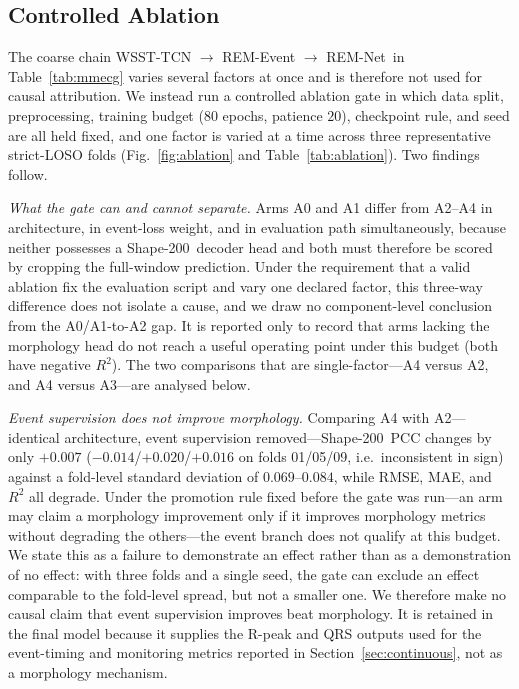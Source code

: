 \documentclass[lettersize,journal]{IEEEtran}
\newcommand{\remnet}{REM-Net\xspace}
\newcommand{\shape}{Shape-200\xspace}
\begin{document}
\subsection{Controlled Ablation}
\label{sec:ablation}
The coarse chain WSST-TCN $\rightarrow$ REM-Event $\rightarrow$ \remnet\ in Table~\ref{tab:mmecg} varies several factors at once and is therefore not used for causal attribution. We instead run a controlled ablation gate in which data split, preprocessing, training budget ($80$ epochs, patience $20$), checkpoint rule, and seed are all held fixed, and one factor is varied at a time across three representative strict-LOSO folds (Fig.~\ref{fig:ablation} and Table~\ref{tab:ablation}). Two findings follow.

\emph{What the gate can and cannot separate.} Arms A0 and A1 differ from A2--A4 in architecture, in event-loss weight, and in evaluation path simultaneously, because neither possesses a \shape\ decoder head and both must therefore be scored by cropping the full-window prediction. Under the requirement that a valid ablation fix the evaluation script and vary one declared factor, this three-way difference does not isolate a cause, and we draw no component-level conclusion from the A0/A1-to-A2 gap. It is reported only to record that arms lacking the morphology head do not reach a useful operating point under this budget (both have negative $R^2$). The two comparisons that are single-factor---A4 versus A2, and A4 versus A3---are analysed below.

\emph{Event supervision does not improve morphology.} Comparing A4 with A2---identical architecture, event supervision removed---\shape\ PCC changes by only $+0.007$ ($-0.014$/$+0.020$/$+0.016$ on folds 01/05/09, i.e.\ inconsistent in sign) against a fold-level standard deviation of $0.069$--$0.084$, while RMSE, MAE, and $R^2$ all degrade. Under the promotion rule fixed before the gate was run---an arm may claim a morphology improvement only if it improves morphology metrics without degrading the others---the event branch does not qualify at this budget. We state this as a failure to demonstrate an effect rather than as a demonstration of no effect: with three folds and a single seed, the gate can exclude an effect comparable to the fold-level spread, but not a smaller one. We therefore make no causal claim that event supervision improves beat morphology. It is retained in the final model because it supplies the R-peak and QRS outputs used for the event-timing and monitoring metrics reported in Section~\ref{sec:continuous}, not as a morphology mechanism.
\end{document}
